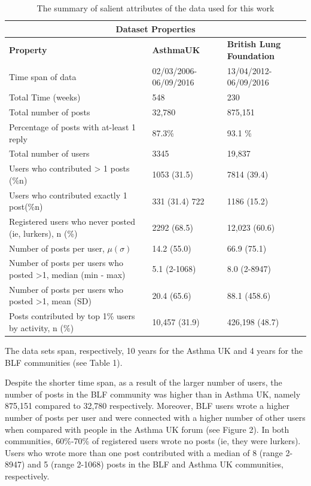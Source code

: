\begin{table}[htb!]
\centering
\begin{tabular}{ |p{5cm}|p{5cm}|p{5cm}| }
    \hline
    \multicolumn{3}{|c|}{Dataset Properties} \\
    \hline
    \hline
     \textbf{Property} & \textbf{AsthmaUK} & \textbf{British Lung Foundation} \\
    \hline
    \hline
     Time span of data   	& 02/03/2006-06/09/2016    	& 13/04/2012-06/09/2016 \\
    \hline
     Total Time (weeks)  	& 548						& 230 \\
    \hline
     Total number of posts	& 32,780					& 875,151 \\
    \hline
     Percentage of posts with at-least 1 reply & 87.3\%			& 93.1 \% \\
    \hline
     Total number of users &	3345					& 19,837 \\
    \hline
     Users who contributed > 1 posts (\%n) & 1053 (31.5)  & 7814 (39.4) \\
    \hline
     Users who contributed exactly 1 post(\%n) & 331 (31.4) 722 & 1186 (15.2) \\
    \hline
     Registered users who never posted (ie, lurkers), n (\%) & 2292 (68.5) & 12,023 (60.6) \\
    \hline
     Number of posts per user, $\mu(\sigma)$ & 14.2 (55.0) & 66.9 (75.1) \\
    \hline
    Number of posts per users who posted >1, median (min - max) & 5.1 (2-1068) & 8.0 (2-8947) \\
    \hline 
    Number of posts per users who posted >1, mean (SD) & 20.4 (65.6) & 88.1 (458.6) \\
    \hline
    Posts contributed by top 1\% users by activity, n (\%) & 10,457 (31.9) & 426,198 (48.7) \\
    \hline 
    
    \hline
\end{tabular}
\caption{The summary of salient attributes of the data used for this work}
\label{table:jmirData}
\end{table}

The data sets span, respectively, 10 years for the Asthma UK and 4 years for the BLF communities (see Table 1).

Despite the shorter time span, as a result of the larger number of users, the number of posts in the BLF community was higher than in Asthma UK, namely 875,151 compared to 32,780 respectively. Moreover, BLF users wrote a higher number of posts per user and were connected with a higher number of other users when compared with people in the Asthma UK forum (see Figure 2). In both communities, 60\%-70\% of registered users wrote no posts (ie, they were lurkers). Users who wrote more than one post contributed with a median of 8 (range 2-8947) and 5 (range 2-1068) posts in the BLF and Asthma UK communities, respectively.

